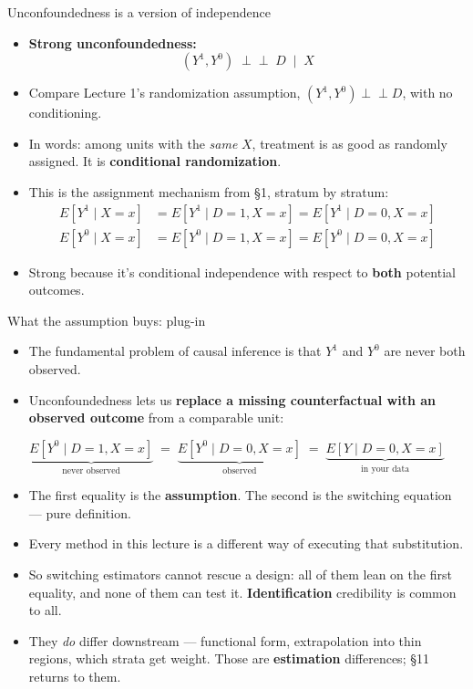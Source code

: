 \documentclass[
  11pt,
  ignorenonframetext,
  aspectratio=169,
]{beamer}
\newcounter{none} %
\providecommand{\tightlist}{%
  \setlength{\itemsep}{0pt}\setlength{\parskip}{0pt}}
\newcommand{\indep}{\perp\!\!\!\perp}
\begin{document}
\begin{frame}{Unconfoundedness is a version of independence}
\protect{}\label{unconfoundedness-is-a-version-of-independence}
\begin{itemize}
\tightlist
\item
  \textbf{Strong unconfoundedness:} \[
  (Y^1, Y^0) \;\indep\; D \;\mid\; X
  \]
\item
  Compare Lecture 1's randomization assumption, \((Y^1,Y^0) \indep D\),
  with no conditioning.
\item
  In words: among units with the \emph{same} \(X\), treatment is as good
  as randomly assigned. It is \textbf{conditional randomization}.
\item
  This is the assignment mechanism from §1, stratum by stratum: \[
  \begin{aligned}
  E[Y^1 \mid X{=}x] &= E[Y^1 \mid D{=}1, X{=}x] = E[Y^1 \mid D{=}0, X{=}x] \\[0.7em]
  E[Y^0 \mid X{=}x] &= E[Y^0 \mid D{=}1, X{=}x] = E[Y^0 \mid D{=}0, X{=}x]
  \end{aligned}
  \]
\item
  Strong because it's conditional independence with respect to
  \textbf{both} potential outcomes.
\end{itemize}
\end{frame}

\begin{frame}{What the assumption buys: plug-in}
\protect{}\label{what-the-assumption-buys-plug-in}
\begin{itemize}
\tightlist
\item
  The fundamental problem of causal inference is that \(Y^1\) and
  \(Y^0\) are never both observed.
\item
  Unconfoundedness lets us \textbf{replace a missing counterfactual with
  an observed outcome} from a comparable unit:
\end{itemize}

\[
\underbrace{E[Y^0 \mid D{=}1, X{=}x]}_{\text{never observed}}
\;=\;
\underbrace{E[Y^0 \mid D{=}0, X{=}x]}_{\text{observed}}
\;=\;
\underbrace{E[Y \mid D{=}0, X{=}x]}_{\text{in your data}}
\]

\begin{itemize}
\tightlist
\item
  The first equality is the \textbf{assumption}. The second is the
  switching equation --- pure definition.
\item
  Every method in this lecture is a different way of executing that
  substitution.
\item
  So switching estimators cannot rescue a design: all of them lean on
  the first equality, and none of them can test it.
  \textbf{Identification} credibility is common to all.
\item
  They \emph{do} differ downstream --- functional form, extrapolation
  into thin regions, which strata get weight. Those are
  \textbf{estimation} differences; §11 returns to them.
\end{itemize}
\end{frame}
\end{document}
